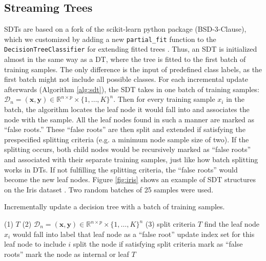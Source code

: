 \subsection{Streaming Trees}
SDTs are based on a fork
of the scikit-learn python package (BSD-3-Clause), which we customized by adding a new \texttt{partial\_fit} function to the \texttt{DecisionTreeClassifier} for extending fitted trees \citep{pedregosa_scikit-learn_2011}. Thus, an SDT is initialized almost in the same way as a DT, where the tree is fitted to the first batch of training samples. The only difference is the input of predefined class labels, as the first batch might not include all possible classes. 
For each incremental update afterwards (Algorithm \ref{alg:sdt}), the SDT takes in one batch of training samples: $\mathcal{D}_n = (\mathbf{x},\mathbf{y}) \in \mathbb{R}^{n \times p} \times \{1,\ldots, K\}^n$. 
Then for every training sample $x_i$ in the batch, the algorithm locates the leaf node it would fall into and associates the node with the sample. All the leaf nodes found in such a manner are marked as ``false roots.'' 
These ``false roots'' are then split and extended if satisfying the prespecified splitting criteria (e.g. a minimum node sample size of two). 
If the splitting occurs, both child nodes would be recursively marked as ``false roots'' and associated with their separate training samples, just like how batch splitting works in DTs. If not fulfilling the splitting criteria, the ``false roots'' would become the new leaf nodes. Figure \ref{fig:iris} shows an example of SDT structures on the Iris dataset \citep{fisher_uci_1988}. Two random batches of 25 samples were used.

\begin{algorithm}[!htb]
\caption{Incrementally update a decision tree with a batch of training samples.}
\label{alg:sdt}
\begin{algorithmic}[1]
\Require 
\Statex (1) $T$ 
\Statex (2) $\mathcal{D}_n = (\mathbf{x},\mathbf{y}) \in \mathbb{R}^{n \times p} \times \{1,\ldots, K\}^n$ 
\Statex (3) split criteria 
\Ensure
$T$ 
\State find the leaf node $x_i$ would fall into
\State label that leaf node as a ``false root''
\State update index set for this leaf node to include $i$
\EndFor
{}
\State split the node if satisfying split criteria
\State mark as ``false roots''
\EndFor 
\State mark the node as internal or leaf
\EndFor
\State \Return $T$
\EndFunction 
\end{algorithmic}
\end{algorithm}

